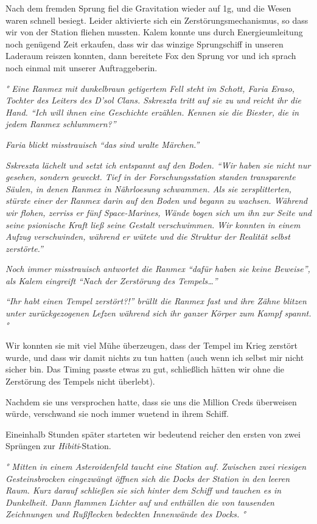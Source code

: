 \documentclass[11pt]{scrartcl}
\begin{document}
Nach dem fremden Sprung fiel die Gravitation wieder auf 1g, und die
Wesen waren schnell besiegt. Leider aktivierte sich ein
Zerstörungsmechanismus, so dass wir von der Station fliehen mussten.
Kalem konnte uns durch Energieumleitung noch genügend Zeit erkaufen,
dass wir das winzige Sprungschiff in unseren Laderaum reiszen konnten,
dann bereitete Fox den Sprung vor und ich sprach noch einmal mit unserer
Auftraggeberin.

\emph{° Eine Ranmex mit dunkelbraun getigertem Fell steht im Schott,
Faria Eraso, Tochter des Leiters des D'sol Clans. Sskreszta tritt auf
sie zu und reicht ihr die Hand. ``Ich will ihnen eine Geschichte
erzählen. Kennen sie die Biester, die in jedem Ranmex schlummern?''}

\emph{Faria blickt misstrauisch ``das sind uralte Märchen.''}

\emph{Sskreszta lächelt und setzt ich entspannt auf den Boden. ``Wir
haben sie nicht nur gesehen, sondern geweckt. Tief in der
Forschungsstation standen transparente Säulen, in denen Ranmex in
Nährloesung schwammen. Als sie zersplitterten, stürzte einer der Ranmex
darin auf den Boden und begann zu wachsen. Während wir flohen, zerriss
er fünf Space-Marines, Wände bogen sich um ihn zur Seite und seine
psionische Kraft ließ seine Gestalt verschwimmen. Wir konnten in einem
Aufzug verschwinden, während er wütete und die Struktur der Realität
selbst zerstörte.''}

\emph{Noch immer misstrauisch antwortet die Ranmex ``dafür haben sie
keine Beweise'', als Kalem eingreift ``Nach der Zerstörung des
Tempels\ldots{}''}

\emph{``Ihr habt einen Tempel zerstört?!'' brüllt die Ranmex fast und
ihre Zähne blitzen unter zurückgezogenen Lefzen während sich ihr ganzer
Körper zum Kampf spannt.°}

Wir konnten sie mit viel Mühe überzeugen, dass der Tempel im Krieg
zerstört wurde, und dass wir damit nichts zu tun hatten (auch wenn ich
selbst mir nicht sicher bin. Das Timing passte etwas zu gut, schließlich
hätten wir ohne die Zerstörung des Tempels nicht überlebt).

Nachdem sie uns versprochen hatte, dass sie uns die Million Creds
überweisen würde, verschwand sie noch immer wuetend in ihrem Schiff.

Eineinhalb Stunden später starteten wir bedeutend reicher den ersten von
zwei Sprüngen zur \emph{Hibiti}-Station.

\emph{° Mitten in einem Asteroidenfeld taucht eine Station auf. Zwischen
zwei riesigen Gesteinsbrocken eingezwängt öffnen sich die Docks der
Station in den leeren Raum. Kurz darauf schließen sie sich hinter dem
Schiff und tauchen es in Dunkelheit. Dann flammen Lichter auf und
enthüllen die von tausenden Zeichnungen und Rußflecken bedeckten
Innenwände des Docks. °}
\end{document}
